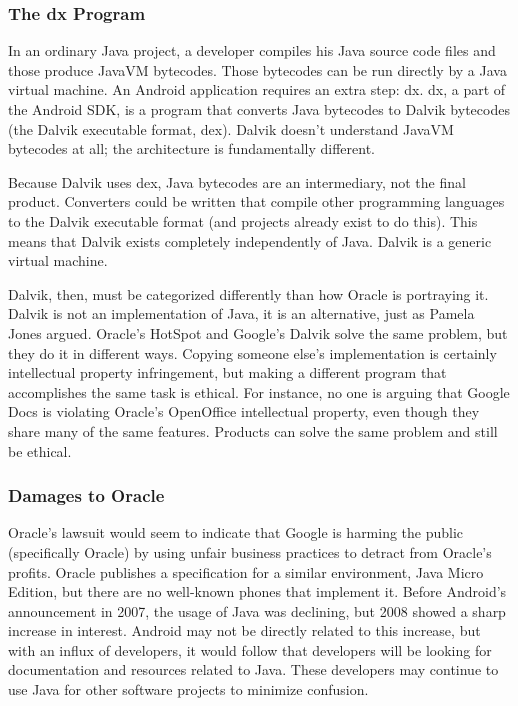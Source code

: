 \documentclass[11pt]{article}
\begin{document}
\begin{multicols}{2}
\subsubsection{The dx Program} %
\label{ssub:dex}

In an ordinary Java project, a developer compiles his Java source code files and
those produce JavaVM bytecodes.  Those bytecodes can be run directly by
a Java virtual machine.  An Android application requires an extra step: dx.
dx, a part of the Android SDK, is a program that converts Java bytecodes to
Dalvik bytecodes (the Dalvik executable format, dex).  Dalvik doesn't understand JavaVM
bytecodes at all; the architecture is fundamentally different.

Because Dalvik uses dex, Java bytecodes are an intermediary, not the final
product.  Converters could be written that compile other programming languages
to the Dalvik executable format (and projects already exist to do this).  This
means that Dalvik exists completely independently of Java.  Dalvik is a generic
virtual machine.

Dalvik, then, must be categorized differently than how Oracle is portraying it.
Dalvik is not an implementation of Java, it is an alternative, just as Pamela
Jones argued. \cite{groklaw}  Oracle's HotSpot and Google's Dalvik solve the
same problem, but they do it in different ways.  Copying someone else's
implementation is certainly intellectual property infringement, but making a
different program that accomplishes the same task is ethical.  For instance, no
one is arguing that Google Docs is violating Oracle's OpenOffice intellectual
property, even though they share many of the same features.  Products can solve
the same problem and still be ethical.


\subsubsection{Damages to Oracle} %
\label{ssub:oracle-damage}

Oracle's lawsuit would seem to indicate that Google is harming the public
(specifically Oracle) by using unfair business practices to detract from
Oracle's profits.  Oracle publishes a specification for a similar environment,
Java Micro Edition, but there are no well-known phones that implement it.
Before Android's announcement in 2007, the usage of Java was declining, but 2008
showed a sharp increase in interest.  \cite{tiobe}  Android may not be directly
related to this increase, but with an influx of developers, it would follow that
developers will be looking for documentation and resources related to Java.
These developers may continue to use Java for other software projects to
minimize confusion.


\end{multicols}
\end{document}
